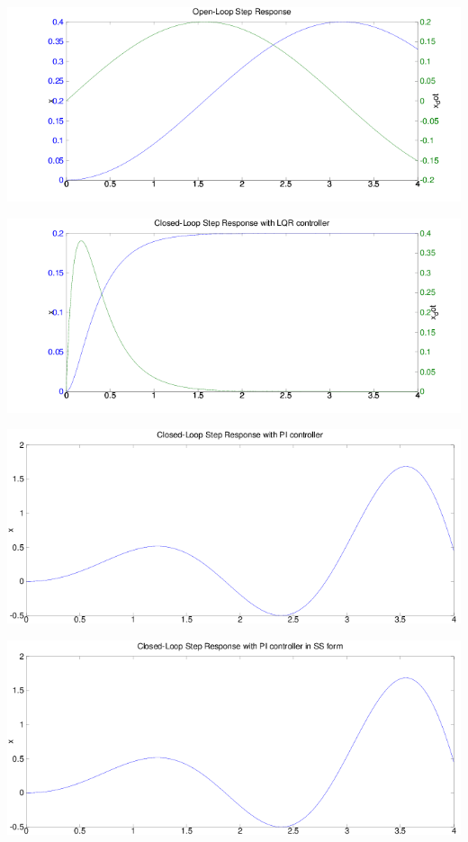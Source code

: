 \documentclass[10pt,letterpaper]{article}
\begin{document}
\begin{center}
\includegraphics[scale=0.6]{image-ol}
\end{center}

\begin{center}
\includegraphics[scale=0.6]{image-lqr}
\end{center}

\begin{center}
\includegraphics[scale=0.6]{image-pi}
\end{center}

\begin{center}
\includegraphics[scale=0.6]{image-pi-ss}
\end{center}
\end{document}
